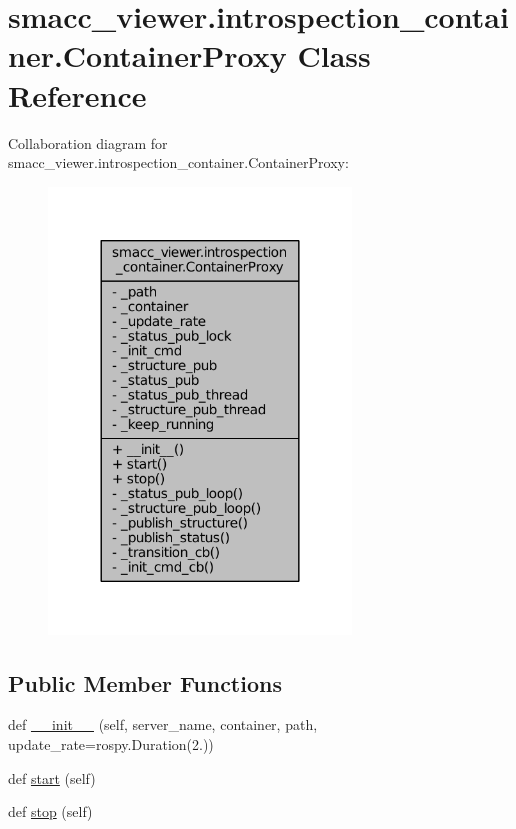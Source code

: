 \hypertarget{classsmacc__viewer_1_1introspection__container_1_1ContainerProxy}{}\section{smacc\+\_\+viewer.\+introspection\+\_\+container.\+Container\+Proxy Class Reference}
\label{classsmacc__viewer_1_1introspection__container_1_1ContainerProxy}


Collaboration diagram for smacc\+\_\+viewer.\+introspection\+\_\+container.\+Container\+Proxy\+:
\nopagebreak
\begin{figure}[H]
\begin{center}
\leavevmode
\includegraphics[width=228pt]{classsmacc__viewer_1_1introspection__container_1_1ContainerProxy__coll__graph}
\end{center}
\end{figure}
\subsection*{Public Member Functions}
\begin{DoxyCompactItemize}
\item 
def \hyperlink{classsmacc__viewer_1_1introspection__container_1_1ContainerProxy_a10bb912a8cee1f958ab2359344fc04b0}{\+\_\+\+\_\+init\+\_\+\+\_\+} (self, server\+\_\+name, container, path, update\+\_\+rate=rospy.\+Duration(2.))
\item 
def \hyperlink{classsmacc__viewer_1_1introspection__container_1_1ContainerProxy_aeec006c3f7cdd4570597ec1153961d20}{start} (self)
\item 
def \hyperlink{classsmacc__viewer_1_1introspection__container_1_1ContainerProxy_a9e504e0b390bf0a6a1ecaca410bbc996}{stop} (self)
\end{DoxyCompactItemize}
